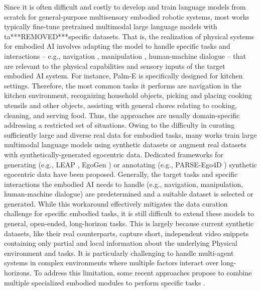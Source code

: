 \documentclass[10pt,journal,compsoc]{IEEEtran}
\begin{document}
	Since it is often difficult and costly to develop and train language models from scratch for general-purpose multisensory embodied robotic systems, most works typically fine-tune pretrained multimodal large language models with ta***REMOVED***specific datasets. That is, the realization of physical systems for embodied AI involves adapting the model to handle specific tasks and interactions – e.g., navigation \cite{wang2022towards,bigazzi2021out,gao2024vision}, manipulation \cite{li2024manipllm,zhang2024empowering}, human-machine dialogue \cite{kalinowska2023embodied,shidara2024adapting} – that are relevant to the physical capabilities and sensory inputs of the target embodied AI system. For instance, Palm-E \cite{driess2023palm} is specifically designed for kitchen settings. Therefore, the most common tasks it performs are navigation in the kitchen environment, recognizing household objects, picking and placing cooking utensils and other objects, assisting with general chores relating to cooking, cleaning, and serving food. Thus, the approaches are usually domain-specific addressing a restricted set of situations.  
	Owing to the difficulty in curating sufficiently large and diverse real data for embodied tasks, many works \cite{taran2024benchmarking,leonardi2022egocentric,birlo2024hup} train large multimodal language models using synthetic datasets or augment real datasets with synthetically-generated egocentric data. Dedicated frameworks for generating (e.g., LEAP \cite{dessalene2023leap}, EgoGen \cite{li2024egogen}) or annotating (e.g., PARSE-Ego4D \cite{abreu2024parse}) synthetic egocentric data have been proposed. Generally, the target tasks and specific interactions the embodied AI needs to handle (e.g., navigation, manipulation, human-machine dialogue) are predetermined and a suitable dataset is selected or generated. While this workaround effectively mitigates the data curation challenge for specific embodied tasks, it is still difficult to extend these models to general, open-ended, long-horizon tasks. This is largely because current synthetic datasets, like their real counterparts, capture short, independent video snippets containing only partial and local information about the underlying
	Physical environment and tasks. It is particularly challenging to handle multi-agent systems \cite{wang2024survey,zhang2024proagent,guo2024large} in complex environments where multiple factors interact over long-horizons. To address this limitation, some recent approaches propose to combine multiple specialized embodied modules to perform specific tasks \cite{zhang2023building,hassouna2024llm}. 
	
\end{document}
